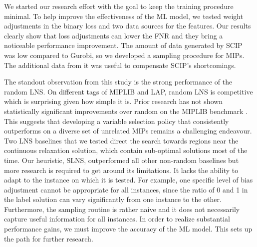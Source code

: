 \documentclass[3p, authoryear, times]{elsarticle}
\begin{document}
We started our research effort with the goal to keep the training procedure minimal. To help improve the effectiveness of the ML model, we tested weight adjustments in the binary loss and two data sources for the features. Our results clearly show that loss adjustments can lower the FNR and they bring a noticeable performance improvement. The amount of data generated by SCIP was low compared to Gurobi, so we developed a sampling procedure for MIPs. The additional data from it was useful to compensate SCIP's shortcomings.  

The standout observation from this study is the strong performance of the random LNS. On different tags of MIPLIB and LAP, random LNS is competitive which is surprising given how simple it is. Prior research has not shown statistically significant improvements over random on the MIPLIB benchmark \citep{sonnerat_learning_2022, liu_machine_2023}. This suggests that developing a variable selection policy that consistently outperforms on a diverse set of unrelated MIPs remains a challenging endeavour. Two LNS baselines that we tested direct the search towards regions near the continuous relaxation solution, which contain sub-optimal solutions most of the time. Our heuristic, SLNS, outperformed all other non-random baselines but more research is required to get around its limitations. It lacks the ability to adapt to the instance on which it is tested. For example, one specific level of bias adjustment cannot be appropriate for all instances, since the ratio of 0 and 1 in the label solution can vary significantly from one instance to the other. Furthermore, the sampling routine is rather naive and it does not necessarily capture useful information for all instances. In order to realize substantial performance gains, we must improve the accuracy of the ML model. This sets up the path for further research.
\end{document}

